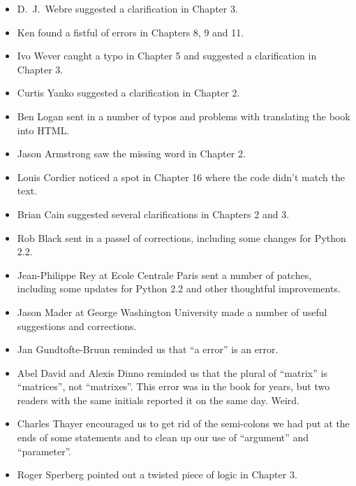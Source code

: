 \begin{itemize}
\item D.~J.~Webre suggested a clarification in Chapter 3.

\item Ken found a fistful of errors in Chapters 8, 9 and 11.

\item Ivo Wever caught a typo in Chapter 5 and suggested a clarification
in Chapter 3.

\item Curtis Yanko suggested a clarification in Chapter 2.

\item Ben Logan sent in a number of typos and problems with translating
the book into HTML.

\item Jason Armstrong saw the missing word in Chapter 2.

\item Louis Cordier noticed a spot in Chapter 16 where the code
didn't match the text.

\item Brian Cain suggested several clarifications in Chapters 2 and 3.

\item Rob Black sent in a passel of corrections, including some
changes for Python 2.2.

\item Jean-Philippe Rey at Ecole Centrale
Paris sent a number of patches, including some updates for Python 2.2
and other thoughtful improvements.

\item Jason Mader at George Washington University made a number
of useful suggestions and corrections.

\item Jan Gundtofte-Bruun reminded us that ``a error'' is an error.

\item Abel David and Alexis Dinno reminded us that the plural of
``matrix'' is ``matrices'', not ``matrixes''.  This error was in the
book for years, but two readers with the same initials reported it on
the same day.  Weird.

\item Charles Thayer encouraged us to get rid of the semi-colons
we had put at the ends of some statements and to clean up our
use of ``argument'' and ``parameter''.

\item Roger Sperberg pointed out a twisted piece of logic in Chapter 3.


\end{itemize}
